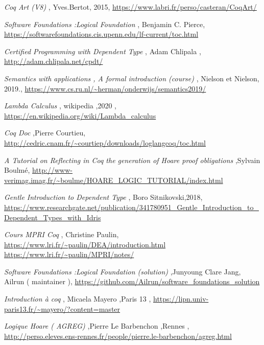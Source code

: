 \documentclass{article}
\begin{document}
\pagebreak
\begin{thebibliography}{30}

{\em Coq Art (V8)  },{ Yves.Bertot, 2015},
\url{https://www.labri.fr/perso/casteran/CoqArt/}


{\em Software Foundations :Logical Foundation } , {Benjamin C. Pierce},
\url{https://softwarefoundations.cis.upenn.edu/lf-current/toc.html}


{\em Certified Programming with Dependent Type }, {Adam Chlipala  },
\url{http://adam.chlipala.net/cpdt/}


{\em Semantics with applications , A formal introduction (course) }, { Nielson et Nielson, 2019.}, \url{https://www.cs.ru.nl/~herman/onderwijs/semantics2019/}


{\em Lambda Calculus }, { wikipedia ,2020  },
\url{https://en.wikipedia.org/wiki/Lambda_calculus}


{\em Coq Doc },{Pierre Courtieu},
\url{http://cedric.cnam.fr/~courtiep/downloads/loglangcoq/toc.html}


{\em A Tutorial on Reflecting in Coq the generation of Hoare proof obligations },{Sylvain Boulmé},
\url{http://www-verimag.imag.fr/~boulme/HOARE_LOGIC_TUTORIAL/index.html}



{\em Gentle Introduction to Dependent Type }, {Boro Sitnikovski,2018}, 
\url{https://www.researchgate.net/publication/341780951_Gentle_Introduction_to_Dependent_Types_with_Idris}



{\em Cours MPRI Coq }, {Christine Paulin}, 
\url{https://www.lri.fr/~paulin/DEA/introduction.html}
\\
\url{https://www.lri.fr/~paulin/MPRI/notes/}



{\em Software Foundations :Logical Foundation (solution)  },{Junyoung Clare Jang, Ailrun ( maintainer )},
\url{https://github.com/Ailrun/software_foundations_solution}


{\em Introduction à coq }, {Micaela Mayero ,Paris 13 },
\url{https://lipn.univ-paris13.fr/~mayero/?content=master}


{\em Logique Hoare ( AGREG) },{Pierre Le Barbenchon ,Rennes }, 
\url{http://perso.eleves.ens-rennes.fr/people/pierre.le-barbenchon/agreg.html}




\end{thebibliography}
\end{document}
